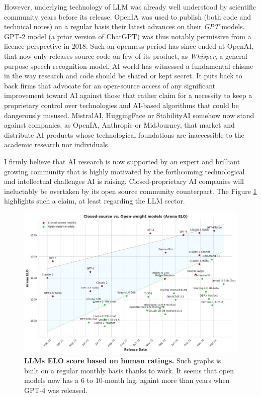 However, underlying technology of \ac{LLM} was already well understood by scientific community years before its release. OpenIA was used to publish (both code and technical notes) on a regular basis their latest advances on their \textit{GPT} models. GPT-2 model (a prior version of ChatGPT) was thus notably permissive from a licence perspective in 2018. Such an openness period has since ended at OpenAI, that now only releases source code on few of its product, as \textit{Whisper}, a general-purpose speech recognition model. \ac{AI} world has witnessed a fundamental chisme in the way research and code should be shared or kept secret. It puts back to back firms that advocate for an open-source access of any significant improvement toward \ac{AI} against those that rather claim for a necessity to keep a proprietary control over technologies and \ac{AI}-based algorithms that could be dangerously misused. MistralAI, HuggingFace or StabilityAI somehow now stand against companies, as OpenIA, Anthropic or MidJourney, that market and distribute \ac{AI} products whose technological foundations are inaccessible to the academic research nor individuals. 

I firmly believe that \ac{AI} research is now supported by an expert and brilliant growing community that is highly motivated by the forthcoming technological and intellectual challenges \ac{AI} is raising. Closed-proprietary \ac{AI} companies will ineluctably be overtaken by  its open source community counterpart. The Figure \ref{fig:conclusion-openclose} highlights such a claim, at least regarding the \ac{LLM} sector. 
\begin{figure}[htb!]
    \center
  \includegraphics[width=\linewidth]{images/conclusion/open-close.jpeg}
  \caption{\textbf{LLMs ELO score based on human ratings.} Such graphs is built on a regular monthly basis thanks to \citep{chiang2024chatbot} work. It seems that open models now has a 6 to 10-month lag, againt more than years when GPT-4 was released.}
  \label{fig:conclusion-openclose}
\end{figure}


